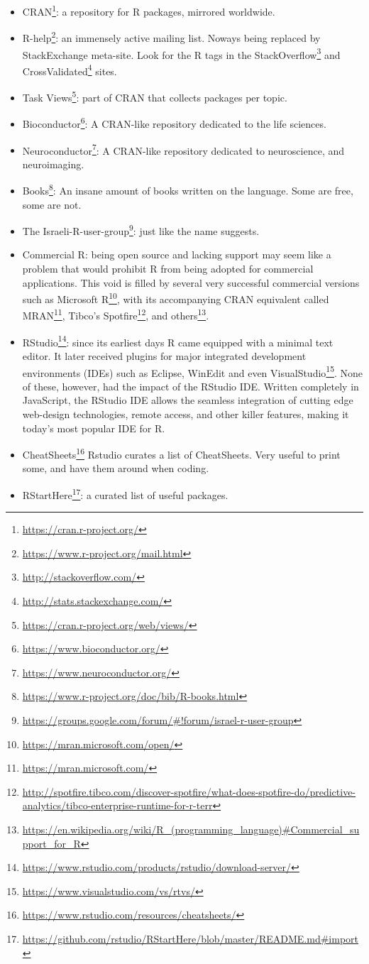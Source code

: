 \documentclass[]{book}
\renewcommand{\href}[2]{#2\footnote{\url{#1}}}
\theoremstyle{definition}
\theoremstyle{definition}
\theoremstyle{definition}
\theoremstyle{remark}
\begin{document}
\begin{itemize}
\item
  \href{https://cran.r-project.org/}{CRAN}:
  a repository for R packages, mirrored worldwide.
\item
  \href{https://www.r-project.org/mail.html}{R-help}:
  an immensely active mailing list.
  Noways being replaced by StackExchange meta-site.
  Look for the R tags in the \href{http://stackoverflow.com/}{StackOverflow} and \href{http://stats.stackexchange.com/}{CrossValidated} sites.
\item
  \href{https://cran.r-project.org/web/views/}{Task Views}:
  part of CRAN that collects packages per topic.
\item
  \href{https://www.bioconductor.org/}{Bioconductor}:
  A CRAN-like repository dedicated to the life sciences.
\item
  \href{https://www.neuroconductor.org/}{Neuroconductor}:
  A CRAN-like repository dedicated to neuroscience, and neuroimaging.
\item
  \href{https://www.r-project.org/doc/bib/R-books.html}{Books}:
  An insane amount of books written on the language. Some are free, some are not.
\item
  \href{https://groups.google.com/forum/\#!forum/israel-r-user-group}{The Israeli-R-user-group}:
  just like the name suggests.
\item
  Commercial R: being open source and lacking support may seem like a problem that would prohibit R from being adopted for commercial applications.
  This void is filled by several very successful commercial versions such as \href{https://mran.microsoft.com/open/}{Microsoft R}, with its accompanying CRAN equivalent called \href{https://mran.microsoft.com/}{MRAN}, \href{http://spotfire.tibco.com/discover-spotfire/what-does-spotfire-do/predictive-analytics/tibco-enterprise-runtime-for-r-terr}{Tibco's Spotfire}, and \href{https://en.wikipedia.org/wiki/R_(programming_language)\#Commercial_support_for_R}{others}.
\item
  \href{https://www.rstudio.com/products/rstudio/download-server/}{RStudio}: since its earliest days R came equipped with a minimal text editor.
  It later received plugins for major integrated development environments (IDEs) such as Eclipse, WinEdit and even \href{https://www.visualstudio.com/vs/rtvs/}{VisualStudio}.
  None of these, however, had the impact of the RStudio IDE.
  Written completely in JavaScript, the RStudio IDE allows the seamless integration of cutting edge web-design technologies, remote access, and other killer features, making it today's most popular IDE for R.
\item
  \href{https://www.rstudio.com/resources/cheatsheets/}{CheatSheets} Rstudio curates a list of CheatSheets. Very useful to print some, and have them around when coding.
\item
  \href{https://github.com/rstudio/RStartHere/blob/master/README.md\#import}{RStartHere}: a curated list of useful packages.
\end{itemize}
\end{document}
